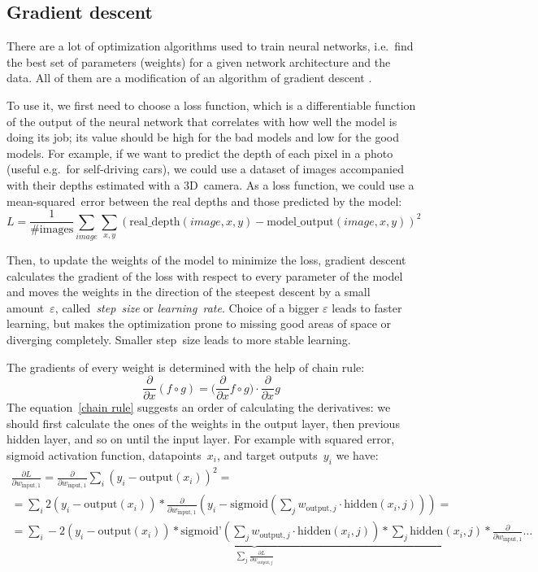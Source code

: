 \subsection{Gradient descent}\label{gradient descent}
There are a lot of optimization algorithms used to train neural networks, i.e.~find the best set of parameters (weights) for a given network architecture and the data. All of them are a modification of an algorithm of gradient descent \cite{gradient-descent}.

To use it, we first need to choose a loss function, which is a differentiable function of the output of the neural network that correlates with how well the model is doing its job; its value should be high for the bad models and low for the good  models. For example, if we want to predict the depth of each pixel in a photo (useful e.g.~for self-driving cars), we could use a dataset of images accompanied with their depths estimated with a 3D~camera. As a loss function, we could use a mean-squared~error between the real depths and those predicted by the model:
$$
L = \frac{1}{\mbox{\# images}}\sum_{image} \sum_{x, y} (\mbox{real\_depth}(image, x, y) - \mbox{model\_output}(image, x, y))^2
$$

Then, to update the weights of the model to minimize the loss, gradient descent calculates the gradient of the loss with respect to every parameter of the model and moves the weights in the direction of the steepest descent by a small amount~$\varepsilon$, called~\emph{step~size} or \emph{learning~rate}. Choice of a bigger $\varepsilon$ leads to faster learning, but makes the optimization prone to missing good areas of space or diverging completely. Smaller step~size leads to more stable
learning.

The gradients of every weight is determined with the help of chain rule:
\begin{equation}\label{chain rule}
  \frac{\partial}{\partial x} (f \circ g) = (\frac{\partial}{\partial x} f \circ g\big) \cdot \frac{\partial}{\partial x}g
\end{equation}
The equation~\eqref{chain rule} suggests an order of calculating the derivatives: we should first calculate the ones of the weights in the output layer, then previous hidden layer, and so on until the input layer. For example with squared error, sigmoid activation function, datapoints~$x_i$, and target outputs~$y_i$ we have:
\begin{multline}
  \frac{\partial L}{\partial w_{\text{input}, 1}} = \frac{\partial}{\partial w_{\text{input}, 1}} \sum_{i} (y_i - \text{output}(x_i))^2 =\\=  \sum_{i} 2(y_i - \text{output}(x_i)) * \frac{\partial}{\partial w_{\text{input}, 1}}
  ( y_i - \text{sigmoid}(\sum_j w_{\text{output}, j} \cdot \text{hidden}(x_i, j))) =\\=
  \underbrace{\sum_{i} -2(y_i - \text{output}(x_i)) * \text{sigmoid'}(\sum_j w_{\text{output}, j} \cdot \text{hidden}(x_i, j)) * \sum_j \text{hidden}(x_i, j)}_{\sum_j \frac{\partial L}{\partial w_{\text{output}, j}}} * \frac{\partial}{\partial w_{\text{input}, 1}}\ldots
\end{multline}

